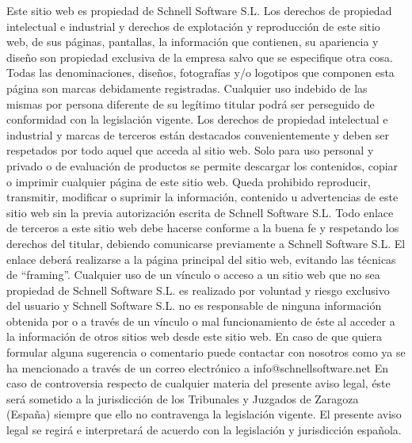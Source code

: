 \documentclass[10pt,a4paper]{article}
\begin{document}
\begin{enumerate}
Este sitio web es propiedad de Schnell Software S.L. Los derechos de propiedad intelectual e industrial y derechos de explotación y reproducción de este sitio web, de sus páginas, pantallas, la información que contienen, su apariencia y diseño son propiedad exclusiva de la empresa salvo que se especifique otra cosa. Todas las denominaciones, diseños, fotografías y/o logotipos que componen esta página son marcas debidamente registradas. Cualquier uso indebido de las mismas por persona diferente de su legítimo titular podrá ser perseguido de conformidad con la legislación vigente. Los derechos de propiedad intelectual e industrial y marcas de terceros están destacados convenientemente y deben ser respetados por todo aquel que acceda al sitio web. Solo para uso personal y privado o de evaluación de productos se permite descargar los contenidos, copiar o imprimir cualquier página de este sitio web. Queda prohibido reproducir, transmitir, modificar o suprimir la información, contenido u advertencias de este sitio web sin la previa autorización escrita de Schnell Software S.L.
Todo enlace de terceros a este sitio web debe hacerse conforme a la buena fe y respetando los derechos del titular, debiendo comunicarse previamente a Schnell Software S.L. El enlace deberá realizarse a la página principal del sitio web, evitando las técnicas de “framing”.
Cualquier uso de un vínculo o acceso a un sitio web que no sea propiedad de Schnell Software S.L. es realizado por voluntad y riesgo exclusivo del usuario y Schnell Software S.L. no es responsable de ninguna información obtenida por o a través de un vínculo o mal funcionamiento de éste al acceder a la información de otros sitios web desde este sitio web.
En caso de que quiera formular alguna sugerencia o comentario puede contactar con nosotros como ya se ha mencionado a través de un correo electrónico a info@schnellsoftware.net
En caso de controversia respecto de cualquier materia del presente aviso legal, éste será sometido a la jurisdicción de los Tribunales y Juzgados de Zaragoza (España) siempre que ello no contravenga la legislación vigente. El presente aviso legal se regirá e interpretará de acuerdo con la legislación y jurisdicción española.


\end{enumerate}
\end{document}
